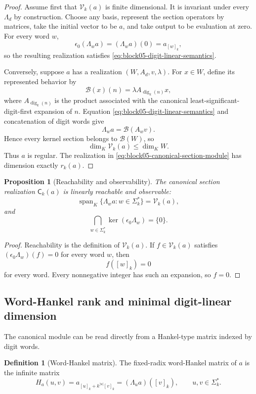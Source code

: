 \documentclass[11pt]{article}
\newtheorem{proposition}[theorem]{Proposition}
\theoremstyle{definition}
\newtheorem{definition}[theorem]{Definition}
\theoremstyle{remark}
\DeclareMathOperator{\Span}{span}
\begin{document}
\begin{proof}
Assume first that \(\mathcal V_k(a)\) is finite dimensional.  It is invariant under every \(\Lambda_d\) by construction.  Choose any basis, represent the section operators by matrices, take the initial vector to be \(a\), and take output to be evaluation at zero.  For every word \(w\),
\[
\epsilon_0(\Lambda_wa)
=(\Lambda_wa)(0)
=a_{[w]_k},
\]
so the resulting realization satisfies \eqref{eq:block05-digit-linear-semantics}.

Conversely, suppose \(a\) has a realization \((W,A_d,v,\lambda)\).  For \(x\in W\), define its represented behavior by
\[
\mathcal B(x)(n)
=
\lambda A_{\operatorname{dig}_k(n)}x,
\]
where \(A_{\operatorname{dig}_k(n)}\) is the product associated with the canonical least-significant-digit-first expansion of \(n\).  Equation \eqref{eq:block05-digit-linear-semantics} and concatenation of digit words give
\[
\Lambda_w a
=
\mathcal B(A_wv).
\]
Hence every kernel section belongs to \(\mathcal B(W)\), so
\[
\dim_K\mathcal V_k(a)
\leq
\dim_K W.
\]
Thus \(a\) is regular.  The realization in \eqref{eq:block05-canonical-section-module} has dimension exactly \(r_k(a)\).
\end{proof}

\begin{proposition}[Reachability and observability]
\label{prop:block05-reach-observe}
The canonical section realization \(\mathsf C_k(a)\) is linearly reachable and observable:
\[
\Span_K\{\Lambda_wa:w\in\Sigma_k^*\}
=
\mathcal V_k(a),
\]
and
\[
\bigcap_{w\in\Sigma_k^*}
\ker(\epsilon_0\Lambda_w)
=
\{0\}.
\]
\end{proposition}

\begin{proof}
Reachability is the definition of \(\mathcal V_k(a)\).  If \(f\in\mathcal V_k(a)\) satisfies \((\epsilon_0\Lambda_w)(f)=0\) for every word \(w\), then
\[
f([w]_k)=0
\]
for every word.  Every nonnegative integer has such an expansion, so \(f=0\).
\end{proof}

\subsection{Word-Hankel rank and minimal digit-linear dimension}

The canonical module can be read directly from a Hankel-type matrix indexed by digit words.

\begin{definition}[Word-Hankel matrix]
The fixed-radix word-Hankel matrix of \(a\) is the infinite matrix
\begin{equation}
H_a(u,v)
=
 a_{[u]_k+k^{|u|}[v]_k}
=
(\Lambda_u a)([v]_k),
\qquad
u,v\in\Sigma_k^*.
\label{eq:block05-word-hankel}
\end{equation}
\end{definition}
\end{document}
